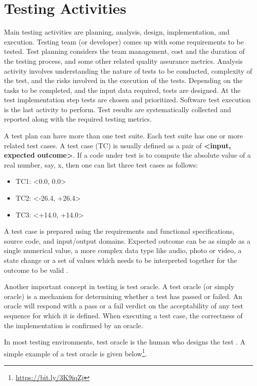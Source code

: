 \section{Testing Activities}
Main testing activities are planning, analysis, design, implementation, and  execution.  Testing team (or developer) comes up with some requirements to be tested. Test planning considers the team management, cost and the duration of the testing process, and some other related quality assurance metrics. Analysis activity involves understanding the nature of tests to be conducted, complexity of the test, and the risks involved in the execution of the tests. Depending on the tasks to be completed, and the input data required, tests are designed. At the test implementation step tests are chosen and prioritized. Software test execution is the last activity to perform. Test results are systematically collected and reported along with the required testing metrics.

A test plan can have more than one test suite. Each test suite has one or more related test cases. A test case (TC) is usually defined as a pair of \textbf{<input, expected outcome>}. If a code under test is to compute the absolute value of a real number, say, x, then one can list three test cases as follows:
\begin{itemize}[nosep]
    \item TC1: <0.0, 0.0>
    \item TC2: <-26.4, +26.4>
    \item TC3: <+14.0, +14.0>
\end{itemize}
A test case is prepared using the requirements and functional specifications, source code, and input/output domains. Expected outcome can be as simple as a single numerical value, a more complex data type like audio, photo or video, a state change or a set of values which needs to be interpreted together for the outcome to be valid \autocite{naik2011software}.

Another important concept in testing is test oracle. A test oracle (or simply oracle) is a mechanism for determining whether a test has passed or failed. An oracle will respond with a pass or a fail verdict on the acceptability of any test sequence for which it is defined. When executing a test case, the correctness of the implementation is confirmed by an oracle.

In most testing environments, test oracle is the human who designs the test \autocite{bertolino1996use}. A simple example of a test oracle is given below\footnote{\url{https://bit.ly/3K9iqZj}}. 


